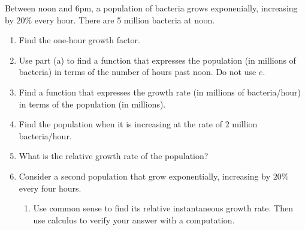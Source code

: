 \documentclass{ximera}
\begin{document}
\begin{question}  \label{Q9deLFLDF}
Between noon and 6pm, a population of bacteria grows exponenially, increasing by $20\%$ every hour. There are 5 million bacteria at noon.

\begin{enumerate}

\item Find the one-hour growth factor.

\item Use part (a) to find a function that expresses the population (in millions of bacteria) in terms of the number of hours past noon. Do not use $e$.

\item Find a function that expresses the growth rate (in millions of bacteria/hour) in terms of the population (in millions).

\item Find the population when it is increasing at the rate of $2$ million bacteria/hour.

\item What is the relative growth rate of the population?

\item Consider a second population that grow exponentially, increasing by $20\%$ every four hours. 

\begin{enumerate}
\item Use common sense to find its relative instantaneous growth rate. Then use calculus to verify your answer with a computation.
\end{enumerate}
\end{enumerate}

\end{question}
\end{document}

